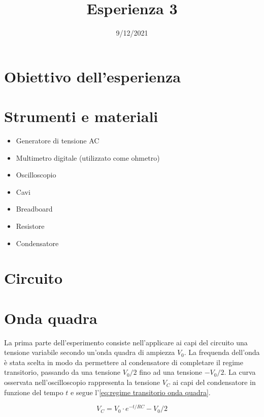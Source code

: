 \documentclass[11pt, a4paper]{article}
\title{Esperienza 3}
\date{9/12/2021}
\author{}
\numberwithin{equation}{section} %
\begin{document}
\maketitle

\thispagestyle{empty}

\tableofcontents

\section{Obiettivo dell'esperienza}


\section{Strumenti e materiali}

\begin{itemize}
    \item Generatore di tensione AC
    \item Multimetro digitale (utilizzato come ohmetro)
    \item Oscilloscopio
    \item Cavi
    \item Breadboard
    \item Resistore
    \item Condensatore
\end{itemize}

\section{Circuito}

\section{Onda quadra}

La prima parte dell'esperimento consiste nell'applicare ai capi del circuito una tensione variabile secondo un'onda quadra di ampiezza \(V_{0}\). La frequenda dell'onda è stata scelta in modo da permettere al condensatore di completare il regime transitorio, passando da una tensione \(V_{0}/2\) fino ad una tensione \(- V_{0}/2\). La curva osservata nell'oscilloscopio rappresenta la tensione \(V_{C}\) ai capi del condensatore in funzione del tempo \(t\) e segue l'\autoref{eq:regime transitorio onda quadra}.

\begin{equation} \label{eq:regime transitorio onda quadra}
    V_{C} = V_{0} \cdot e^{-t/RC} - V_{0}/2
\end{equation}
\end{document}
